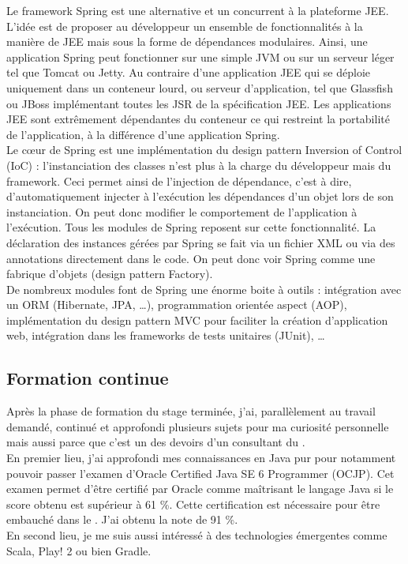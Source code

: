 Le framework Spring \cite{spring} est une alternative et un concurrent à la plateforme JEE. L'idée est de proposer au développeur un ensemble de fonctionnalités à la manière de JEE mais sous la forme de dépendances modulaires. Ainsi, une application Spring peut fonctionner sur une simple JVM ou sur un serveur léger tel que Tomcat ou Jetty. Au contraire d'une application JEE qui se déploie uniquement dans un conteneur lourd, ou serveur d'application, tel que Glassfish ou JBoss implémentant toutes les JSR de la spécification JEE. Les applications JEE sont extrêmement dépendantes du conteneur ce qui restreint la portabilité de l'application, à la différence d'une application Spring.\\

Le c\oe{}ur de Spring est une implémentation du design pattern Inversion of Control (IoC) : l'instanciation des classes n'est plus à la charge du développeur mais du framework. Ceci permet ainsi de l'injection de dépendance, c'est à dire, d'automatiquement injecter à l'exécution les dépendances d'un objet lors de son instanciation. On peut donc modifier le comportement de l'application à l'exécution. Tous les modules de Spring reposent sur cette fonctionnalité. La déclaration des instances gérées par Spring se fait via un fichier XML ou via des annotations directement dans le code. On peut donc voir Spring comme une fabrique d'objets (design pattern Factory).\\

De nombreux modules font de Spring une énorme boite à outils : intégration avec un ORM (Hibernate, JPA, \dots), programmation orientée aspect (AOP), implémentation du design pattern MVC pour faciliter la création d'application web, intégration dans les frameworks de tests unitaires (JUnit), \dots

\subsection{Formation continue}

Après la phase de formation du stage terminée, j'ai, parallèlement au travail demandé, continué et approfondi plusieurs sujets pour ma curiosité personnelle mais aussi parce que c'est un des devoirs d'un consultant du \excilysGroup{}.\\

En premier lieu, j'ai approfondi mes connaissances en Java pur pour notamment pouvoir passer l'examen d'Oracle Certified Java SE 6 Programmer (OCJP). Cet examen permet d'être certifié par Oracle comme \flqq{}maîtrisant le langage Java\frqq{} si le score obtenu est supérieur à 61 \%. Cette certification est nécessaire pour être embauché dans le \excilysGroup{}. J'ai obtenu la note de 91 \%.\\

En second lieu, je me suis aussi intéressé à des technologies émergentes comme Scala, Play! 2 ou bien Gradle.